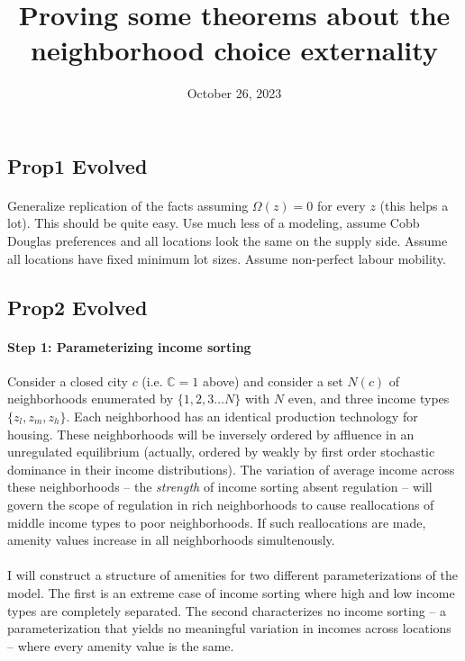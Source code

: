 \documentclass[11pt]{article}
\title{Proving some theorems about the neighborhood choice externality}
\author{}
\date{October 26, 2023}
\begin{document}
\maketitle
\subsection{Prop1 Evolved}
\paragraph*{}
Generalize replication of the facts assuming $\Omega(z) = 0$ for every $z$ (this helps a lot). This should be quite easy. Use much less of a modeling, assume Cobb Douglas preferences and all locations look the same on the supply side. Assume all locations have fixed minimum lot sizes. Assume non-perfect labour mobility. 

\subsection{Prop2 Evolved}
\paragraph*{Step 1: Parameterizing income sorting} Consider a closed city $c$ (i.e. $\mathbb{C} = 1$  above) and consider a set $N(c)$ of neighborhoods enumerated by $\{1, 2, 3 \dots N\}$ with $N$ even, and three income types $\{z_{l}, z_{m}, z_{h}\}$. Each neighborhood has an identical production technology for housing. These neighborhoods will be inversely ordered by affluence in an unregulated equilibrium (actually, ordered by weakly by first order stochastic dominance in their income distributions). The variation of average income across these neighborhoods -- the \textit{strength} of income sorting absent regulation -- will govern the scope of regulation in rich neighborhoods to cause reallocations of middle income types to poor neighborhoods. If such reallocations are made, amenity values increase in all neighborhoods simultenously. 

\paragraph*{}
I will construct a structure of amenities for two different parameterizations of the model. The first is an extreme case of income sorting where high and low income types are completely separated. The second characterizes no income sorting -- a parameterization that yields no meaningful variation in incomes across locations -- where every amenity value is the same.
\end{document}
